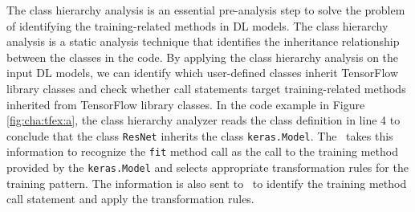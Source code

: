 The class hierarchy analysis is an essential pre-analysis step to solve the
problem of identifying the training-related methods in DL models.  The class
hierarchy analysis is a static analysis technique that identifies the
inheritance relationship between the classes in the code. 
By applying the class hierarchy analysis on the input DL models, we can
identify which user-defined classes inherit TensorFlow library classes and
check whether call statements target training-related methods inherited from
TensorFlow library classes.
In the code example in Figure \ref{fig:cha:tfex:a}, the class
hierarchy analyzer reads the class definition in line 4 to conclude that the
class {\tt ResNet} inherits the class {\tt keras.Model}. 
The \tapi~takes this information to recognize the {\tt fit} method
call as the call to the training method provided by the {\tt keras.Model} and
selects appropriate transformation rules for the training pattern.
The information is also sent to \atran~to identify the training method call
statement and apply the transformation rules.


